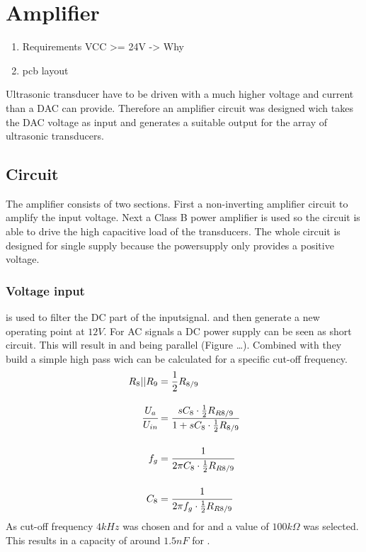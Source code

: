 \section{Amplifier}\label{sec:pcb:amp}

\begin{enumerate}
  \item Requirements
  \subitem VCC >= 24V -> Why
  \item pcb layout
\end{enumerate}

Ultrasonic transducer have to be driven with a much higher voltage and current than a DAC can provide. Therefore an amplifier circuit was designed wich takes the DAC voltage as input and generates a suitable output for the array of ultrasonic transducers.

\subsection{Circuit}

The amplifier consists of two sections. First a non-inverting amplifier circuit to amplify the input voltage. Next a Class B power amplifier is used so the circuit is able to drive the high capacitive load of the transducers. The whole circuit is designed for single supply because the powersupply only provides a positive voltage.\p

\subsubsection*{Voltage input}
%
 is used to filter the DC part of the inputsignal.  and  then generate a new operating point at $12V$. For AC signals a DC power supply can be seen as short circuit. This will result in  and  being parallel (Figure \dots). Combined with  they build a simple high pass wich can be calculated for a specific cut-off frequency.
%
\begin{align}
  R_8 || R_9 &= \frac{1}{2} R_{8/9} \pmath
  \cfrac{U_a}{U_{in}} &= \cfrac{sC_8\cdot \frac{1}{2}R_{R8/9}}{1 + sC_8\cdot \frac{1}{2}R_{8/9}} \pmath
  f_g &= \cfrac{1}{2 \pi C_8 \cdot \frac{1}{2}R_{R8/9}} \pmath
  C_8 &= \cfrac{1}{2 \pi f_g \cdot \frac{1}{2}R_{R8/9}}
\end{align}
%
As cut-off frequency $4kHz$ was chosen and for  and  a value of $100k\Omega$ was selected. This results in a capacity of around $1.5nF$ for .

